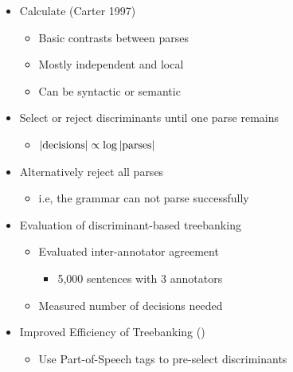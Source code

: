 \documentclass[a4paper,landscape,headrule,footrule,xetex]{foils}
\begin{document}
\begin{itemize}
\item Calculate  (Carter 1997)
  \begin{itemize}
  \item Basic contrasts between parses
  \item Mostly independent and local
  \item Can be syntactic or semantic
  \end{itemize}
\item Select or reject discriminants until one parse remains
  \begin{itemize}
  \item $|{\textnormal{decisions}| \propto \log |\textnormal{parses}|}$
  \end{itemize}
\item Alternatively reject all parses
  \begin{itemize}
  \item i.e, the grammar can not parse successfully
  \end{itemize}
\end{itemize}

\begin{itemize}
\item Evaluation of discriminant-based treebanking
  \begin{itemize}
  \item Evaluated inter-annotator agreement 
    \begin{itemize}
    \item 5,000 sentences with 3 annotators
    \end{itemize}
  \item Measured number of decisions needed
  \end{itemize}
\item Improved Efficiency of Treebanking ()
  \begin{itemize}
  \item Use Part-of-Speech tags to pre-select discriminants
  \end{itemize}
\end{itemize}


\end{document}
